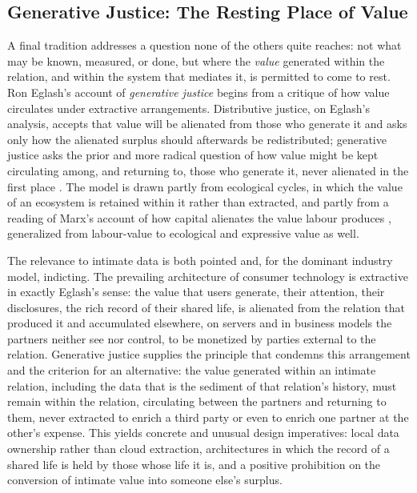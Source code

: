 \subsection{Generative Justice: The Resting Place of Value}\label{p01:sec:generative}

A final tradition addresses a question none of the others quite reaches: not what may be known, measured, or done, but where the \emph{value} generated within the relation, and within the system that mediates it, is permitted to come to rest. Ron Eglash's account of \emph{generative justice} begins from a critique of how value circulates under extractive arrangements. Distributive justice, on Eglash's analysis, accepts that value will be alienated from those who generate it and asks only how the alienated surplus should afterwards be redistributed; generative justice asks the prior and more radical question of how value might be kept circulating among, and returning to, those who generate it, never alienated in the first place \parencite{eglash2016generative}. The model is drawn partly from ecological cycles, in which the value of an ecosystem is retained within it rather than extracted, and partly from a reading of Marx's account of how capital alienates the value labour produces \parencite{marx1867capital}, generalized from labour-value to ecological and expressive value as well.

The relevance to intimate data is both pointed and, for the dominant industry model, indicting. The prevailing architecture of consumer technology is extractive in exactly Eglash's sense: the value that users generate, their attention, their disclosures, the rich record of their shared life, is alienated from the relation that produced it and accumulated elsewhere, on servers and in business models the partners neither see nor control, to be monetized by parties external to the relation. Generative justice supplies the principle that condemns this arrangement and the criterion for an alternative: the value generated within an intimate relation, including the data that is the sediment of that relation's history, must remain within the relation, circulating between the partners and returning to them, never extracted to enrich a third party or even to enrich one partner at the other's expense. This yields concrete and unusual design imperatives: local data ownership rather than cloud extraction, architectures in which the record of a shared life is held by those whose life it is, and a positive prohibition on the conversion of intimate value into someone else's surplus.

